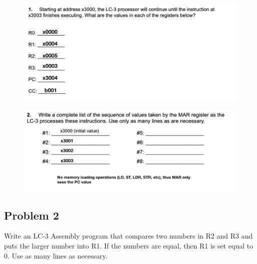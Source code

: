 \documentclass{article}
\begin{document}
\begin{figure}[!h]
    \centering
    \includegraphics[width=1\textwidth]{figures/lc3_qsol1.jpg}
\end{figure}


\begin{figure}[!h]
    \centering
    \includegraphics[width=1\textwidth]{figures/lc3_qsol2.jpg}
\end{figure}

\newpage
\subsection*{Problem 2}
Write an LC-3 Assembly program that compares two numbers in R2 and R3 and puts the larger number into R1. If the numbers are equal, then R1 is set equal  to 0. Use as many lines as necessary.
\end{document}
